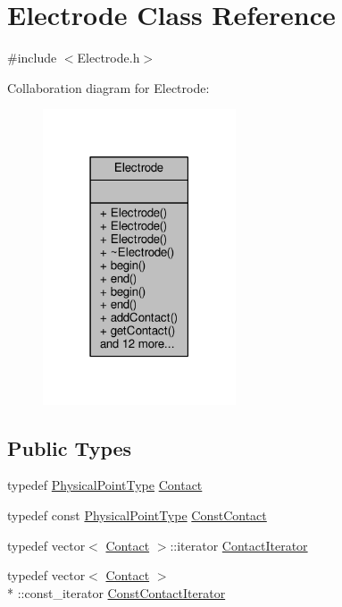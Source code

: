 \hypertarget{classElectrode}{\section{Electrode Class Reference}
\label{classElectrode}
}


{\ttfamily \#include $<$Electrode.\-h$>$}



Collaboration diagram for Electrode\-:
\nopagebreak
\begin{figure}[H]
\begin{center}
\leavevmode
\includegraphics[width=162pt]{classElectrode__coll__graph}
\end{center}
\end{figure}
\subsection*{Public Types}
\begin{DoxyCompactItemize}
\item 
typedef \hyperlink{Definitions_8h_ab9d62e9721984f22424e47212a5ce25d}{Physical\-Point\-Type} \hyperlink{classElectrode_ac64c4a90469345a5d3e260da59765a76}{Contact}
\item 
typedef const \hyperlink{Definitions_8h_ab9d62e9721984f22424e47212a5ce25d}{Physical\-Point\-Type} \hyperlink{classElectrode_a6dc621793b4ffa70e6bc3f2627ec8bf6}{Const\-Contact}
\item 
typedef vector$<$ \hyperlink{classElectrode_ac64c4a90469345a5d3e260da59765a76}{Contact} $>$\-::iterator \hyperlink{classElectrode_a682d94c6e93fc27e2135d3a894fe9722}{Contact\-Iterator}
\item 
typedef vector$<$ \hyperlink{classElectrode_ac64c4a90469345a5d3e260da59765a76}{Contact} $>$\\*
\-::const\-\_\-iterator \hyperlink{classElectrode_a8c56b50a83beed1bf104d079083386b5}{Const\-Contact\-Iterator}
\end{DoxyCompactItemize}
